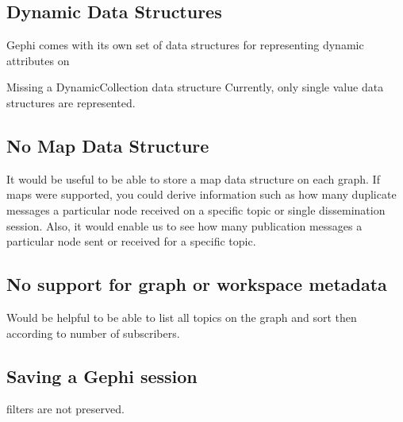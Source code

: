 \subsection{Dynamic Data Structures}

Gephi comes with its own set of data structures for representing
dynamic attributes on

Missing a DynamicCollection data structure Currently, only single value
data structures are represented.

\subsection{No Map Data Structure}
It would be useful to be able to store a map data structure on each
graph. If maps were supported, you could derive information such as how
many duplicate messages a particular node received on a specific topic
or single dissemination session. Also, it would enable us to see how
many publication messages a particular node sent or received for a
specific topic.

\subsection{No support for graph or workspace metadata}
Would be helpful to be able to list all topics on the graph and sort
then according to number of subscribers.

\subsection{Saving a Gephi session}
filters are not preserved.


